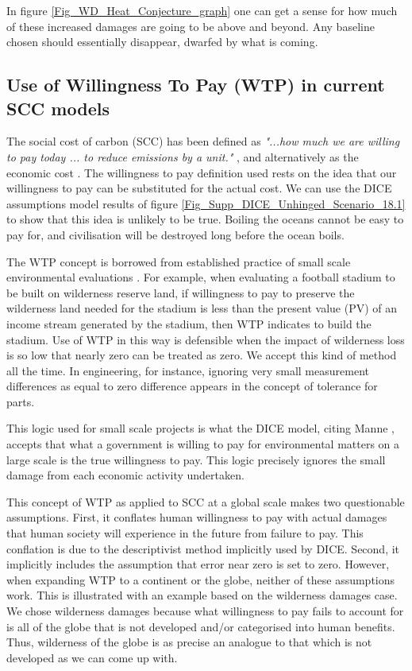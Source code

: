 \documentclass{article}
\begin{document}
In figure \ref{Fig_WD_Heat_Conjecture_graph} one can get a sense for how much  of these increased damages are going to be above and beyond. Any baseline chosen should essentially disappear, dwarfed by what is coming. 

\subsection{Use of Willingness To Pay (WTP) in current SCC models}

The social cost of carbon (SCC) has been defined as \emph{"...how much we are willing to pay today ... to reduce emissions by a unit."} \cite[p. 11]{Stern2021TheEconomicsofImmenseRiskUrgentActionandRadicalChange}, and alternatively as the economic cost \cite{Nordhaus2017RevisitingTheSCC}. The willingness to pay definition used rests on the idea that our willingness to pay can be substituted for the actual cost. We can use the DICE assumptions model results of figure \ref{Fig_Supp_DICE_Unhinged_Scenario_18.1} to show that this idea is unlikely to be true. Boiling the oceans cannot be easy to pay for, and civilisation will be destroyed long before the ocean boils. 

 The WTP concept is borrowed from established practice of small scale environmental evaluations \cite[p. 44]{dietz2021supplement}. For example, when evaluating a football stadium to be built on wilderness reserve land, if willingness to pay to preserve the wilderness land needed for the stadium is less than the present value (PV) of an income stream generated by the stadium, then WTP indicates to build the stadium. Use of WTP in this way is defensible when the impact of wilderness loss is so low that nearly zero can be treated as zero. We accept this kind of method all the time. In engineering, for instance, ignoring very small measurement differences as equal to zero difference appears in the concept of tolerance for parts.  

This logic used for small scale projects is what the DICE model, citing Manne \cite{manne1995merge,manne2005merge}, accepts that what a government is willing to pay for environmental matters on a large scale is the true willingness to pay. This logic precisely ignores the small damage from each economic activity undertaken.  

This concept of WTP as applied to SCC at a global scale makes two questionable assumptions. First, it conflates human willingness to pay with actual damages that human society will experience in the future from failure to pay. This conflation is due to the descriptivist method \cite[p. 47]{Stern2007EconomicsofClimateChangeSternReview} implicitly used by DICE.  Second, it implicitly includes the assumption that error near zero is set to zero. However, when expanding  WTP to a continent or the globe, neither of these assumptions work. This is illustrated with an example based on the wilderness damages case. We chose wilderness damages because what willingness to pay fails to account for is all of the globe that is not developed and/or categorised into human benefits. Thus, wilderness of the globe is as precise an analogue to that which is not developed as we can come up with. 
\end{document}
